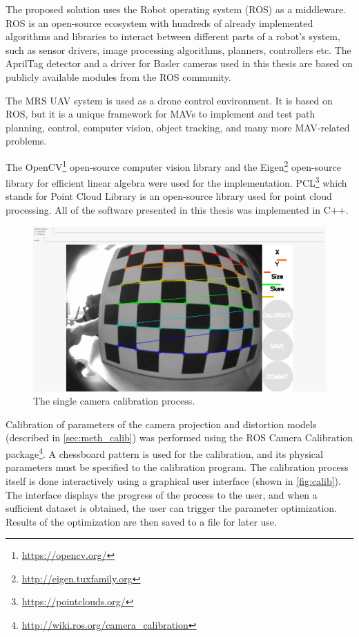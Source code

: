 The proposed solution uses the Robot operating system (ROS) \cite{Rospaper} as a middleware.
ROS is an open-source ecosystem with hundreds of already implemented algorithms and libraries to interact between different parts of a robot's system, such as sensor drivers, image processing algorithms, planners, controllers etc.
The AprilTag detector and a driver for Basler cameras used in this thesis are based on publicly available modules from the ROS community.

The MRS UAV system \cite{Baca2021} is used as a drone control environment. It is based on ROS, but it is a unique framework for MAVs to implement and test path planning, control, computer vision, object tracking, and many more MAV-related problems.

The OpenCV\footnote{\url{https://opencv.org/}} open-source computer vision library and the Eigen\footnote{\url{http://eigen.tuxfamily.org}} open-source library for efficient linear algebra were used for the implementation.
PCL\footnote{\url{https://pointclouds.org/}} which stands for Point Cloud Library is an open-source library used for point cloud processing.
All of the software presented in this thesis was implemented in C++.

\begin{figure}[ht]
    \centering
    \includegraphics[width=.6\textwidth]{graphics/calibration.png}
    \caption{The single camera calibration process.}
    \label{fig:calib}
\end{figure}

Calibration of parameters of the camera projection and distortion models (described in \autoref{sec:meth_calib}) was performed using the ROS Camera Calibration package\footnote{\url{http://wiki.ros.org/camera_calibration}}.
A chessboard pattern is used for the calibration, and its physical parameters must be specified to the calibration program.
The calibration process itself is done interactively using a graphical user interface (shown in \autoref{fig:calib}).
The interface displays the progress of the process to the user, and when a sufficient dataset is obtained, the user can trigger the parameter optimization. 
Results of the optimization are then saved to a file for later use.

